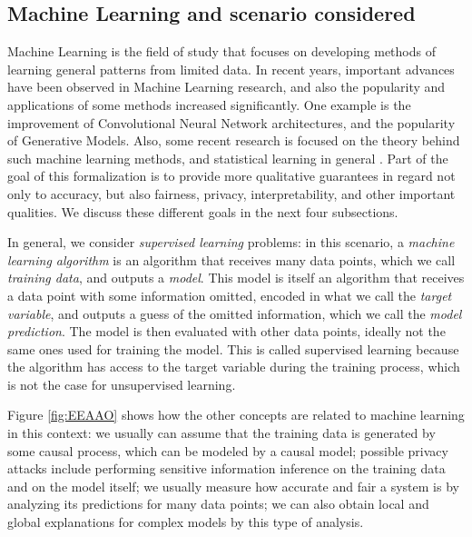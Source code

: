 \subsection{Machine Learning and scenario considered}


Machine Learning is the field of study that focuses on developing methods of learning general patterns from limited data. In recent years, important advances have been observed in Machine Learning research, and also the popularity and applications of some methods increased significantly. One example is the improvement of Convolutional Neural Network architectures, and the popularity of Generative Models. Also, some recent research is focused on the theory behind such machine learning methods\cite{SAAMAP}\cite{grohs2022mathematical}, and statistical learning in general \cite{Vapnik}. Part of the goal of this formalization is to provide more qualitative guarantees in regard not only to accuracy, but also fairness, privacy, interpretability, and other important qualities. We discuss these different goals in the next four subsections.

In general, we consider \emph{supervised learning} problems: in this scenario, a \emph{machine learning algorithm} is an algorithm that receives many data points, which we call \emph{training data}, and outputs a \emph{model}. This model is itself an algorithm that receives a data point with some information omitted, encoded in what we call the \emph{target variable}, and outputs a guess of the omitted information, which we call the \emph{model prediction}. The model is then evaluated with other data points, ideally not the same ones used for training the model. This is called supervised learning because the algorithm has access to the target variable during the training process, which is not the case for unsupervised learning.

Figure \ref{fig:EEAAO} shows how the other concepts are related to machine learning in this context: we usually can assume that the training data is generated by some causal process, which can be modeled by a causal model; possible privacy attacks include performing sensitive information inference on the training data and on the model itself; we usually measure how accurate and fair a system is by analyzing its predictions for many data points; we can also obtain local and global explanations for complex models by this type of analysis.

